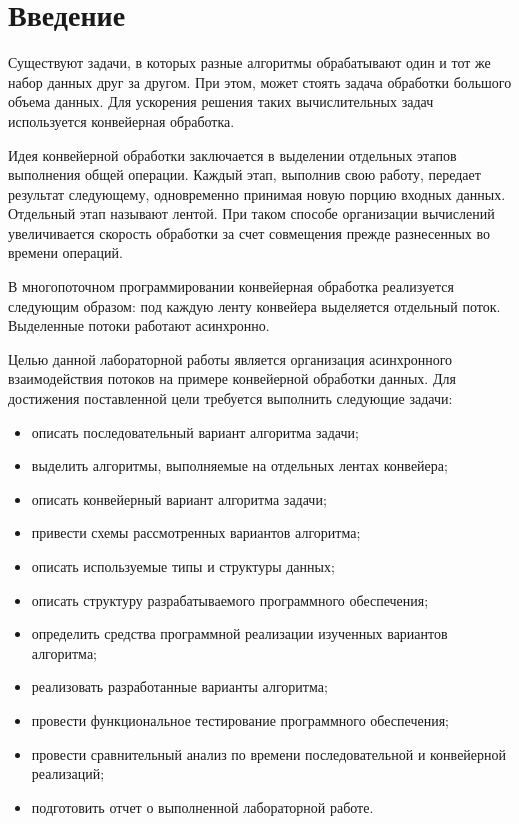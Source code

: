 \chapter*{Введение}

Существуют задачи, в которых разные алгоритмы обрабатывают один и тот же набор данных друг за другом. При этом, может стоять задача обработки большого объема данных. Для ускорения решения таких вычислительных задач используется конвейерная обработка.

Идея конвейерной обработки \cite{idea} заключается в выделении отдельных этапов выполнения общей операции. Каждый этап, выполнив свою работу, передает результат следующему, одновременно принимая новую порцию входных данных. Отдельный этап называют лентой. При таком способе организации вычислений увеличивается скорость обработки за счет совмещения прежде разнесенных во времени операций.

В многопоточном программировании конвейерная обработка реализуется следующим образом: под каждую ленту конвейера выделяется отдельный поток. Выделенные потоки работают асинхронно.

Целью данной лабораторной работы является организация асинхронного взаимодействия потоков на примере конвейерной
обработки данных. Для достижения поставленной цели требуется выполнить следующие задачи:

\begin{itemize}
	\item описать последовательный вариант алгоритма задачи;
	\item выделить алгоритмы, выполняемые на отдельных лентах конвейера;
	\item описать конвейерный вариант алгоритма задачи;
	\item привести схемы рассмотренных вариантов алгоритма;
	\item описать используемые типы и структуры данных;
	\item описать структуру разрабатываемого программного обеспечения;
	\item определить средства программной реализации изученных вариантов алгоритма;
	\item реализовать разработанные варианты алгоритма;
	\item провести функциональное тестирование программного обеспечения;
	\item провести сравнительный анализ по времени последовательной и конвейерной реализаций;
	\item подготовить отчет о выполненной лабораторной работе.
\end{itemize}